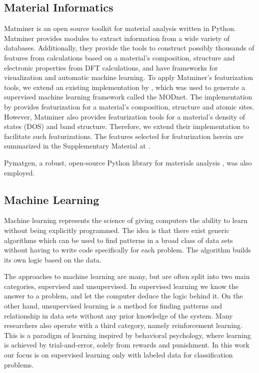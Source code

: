 \documentclass[superscriptaddress,unsortedaddress,
 amsmath,amssymb,
 aps,
]{revtex4-2}
\begin{document}
\subsection*{Material Informatics}  
Matminer \cite{Ward2018} is an open source toolkit for material analysis written in Python. Matminer provides modules to extract information from a wide variety of databases. Additionally, they provide the tools to construct possibly thousands of features from calculations based on a material's composition, structure and electronic properties from DFT calculations, and have frameworks for visualization and automatic machine learning. 
To apply Matminer's featurization tools, we extend an existing implementation by \citeauthor{Breuck2021} \cite{Breuck2021}, which was used to generate a supervised machine learning framework called the MODnet. The implementation by \citeauthor{Breuck2021} provides featurization for a material's composition, structure and atomic sites. However, Matminer also provides featurization tools for a material's density of states (DOS) and band structure. Therefore, we extend their implementation to facilitate such featurizations. 
The features selected for featurization herein are summarized in the Supplementary Material at \cite{supplementary}. 

Pymatgen, a robust, open-source Python library for materials analysis \cite{pymatgen}, was also employed. 

\subsection*{Machine Learning} 

Machine learning represents the science of giving computers the ability to learn without being explicitly programmed. The idea is that there exist generic algorithms which can be used to find patterns in a broad class of data sets without having to write code specifically for each problem. The algorithm builds its own logic based on the data. 

The approaches to machine learning are many, but are often split into two main categories, supervised and unsupervised. In supervised learning we know the answer to a problem, and let the computer deduce the logic behind it. On the other hand, unsupervised learning is a method for finding patterns and relationship in data sets without any prior knowledge of the system. Many researchers also operate with a third category, namely reinforcement learning. This is a paradigm of learning inspired by behavioral psychology, where learning is achieved by trial-and-error, solely from rewards and punishment. In this work our focus is on supervised learning only with labeled data for classification problems.
\end{document}
